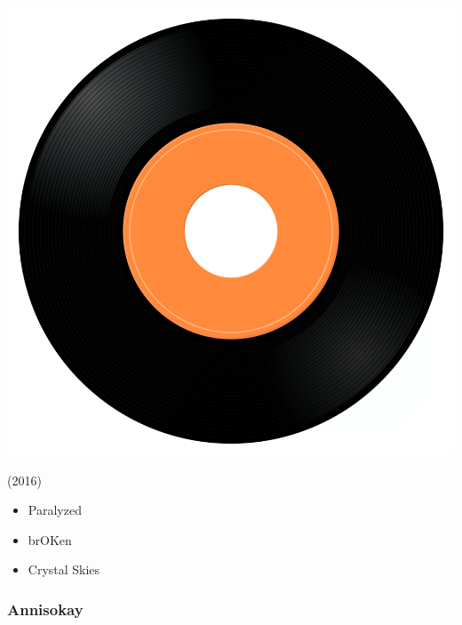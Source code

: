 \begin{minipage}[t]{0.25\textwidth}
\captionsetup{type=figure}
\includegraphics[width=\textwidth]{Images/cover.png}
\caption*{(2016)}
\end{minipage}
\begin{minipage}[t]{0.25\textwidth}\vspace{0pt}
\begin{itemize}[nosep,leftmargin=1em,labelwidth=*,align=left]
	\setlength{\itemsep}{0pt}
	\item Paralyzed
	\item brOKen
	\item Crystal Skies
\end{itemize}
\end{minipage}

\subsubsection{Annisokay}

